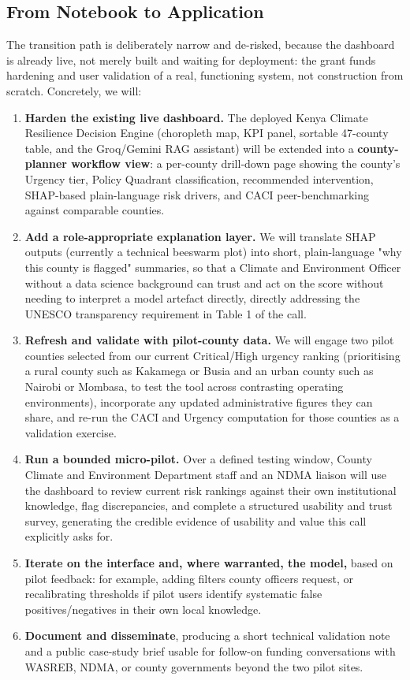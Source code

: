 \documentclass[12pt,a4paper]{article}
\begin{document}
\subsection{From Notebook to Application}
The transition path is deliberately narrow and de-risked, because the dashboard is already live, not merely built and waiting for deployment: the grant funds hardening and user validation of a real, functioning system, not construction from scratch. Concretely, we will:

\begin{enumerate}[leftmargin=1.2em]
\item \textbf{Harden the existing live dashboard.} The deployed Kenya Climate Resilience Decision Engine (choropleth map, KPI panel, sortable 47-county table, and the Groq/Gemini RAG assistant) will be extended into a \textbf{county-planner workflow view}: a per-county drill-down page showing the county's Urgency tier, Policy Quadrant classification, recommended intervention, SHAP-based plain-language risk drivers, and CACI peer-benchmarking against comparable counties.
\item \textbf{Add a role-appropriate explanation layer.} We will translate SHAP outputs (currently a technical beeswarm plot) into short, plain-language "why this county is flagged" summaries, so that a Climate and Environment Officer without a data science background can trust and act on the score without needing to interpret a model artefact directly, directly addressing the UNESCO transparency requirement in Table 1 of the call.
\item \textbf{Refresh and validate with pilot-county data.} We will engage two pilot counties selected from our current Critical/High urgency ranking (prioritising a rural county such as Kakamega or Busia and an urban county such as Nairobi or Mombasa, to test the tool across contrasting operating environments), incorporate any updated administrative figures they can share, and re-run the CACI and Urgency computation for those counties as a validation exercise.
\item \textbf{Run a bounded micro-pilot.} Over a defined testing window, County Climate and Environment Department staff and an NDMA liaison will use the dashboard to review current risk rankings against their own institutional knowledge, flag discrepancies, and complete a structured usability and trust survey, generating the credible evidence of usability and value this call explicitly asks for.
\item \textbf{Iterate on the interface and, where warranted, the model,} based on pilot feedback: for example, adding filters county officers request, or recalibrating thresholds if pilot users identify systematic false positives/negatives in their own local knowledge.
\item \textbf{Document and disseminate}, producing a short technical validation note and a public case-study brief usable for follow-on funding conversations with WASREB, NDMA, or county governments beyond the two pilot sites.
\end{enumerate}
\end{document}
